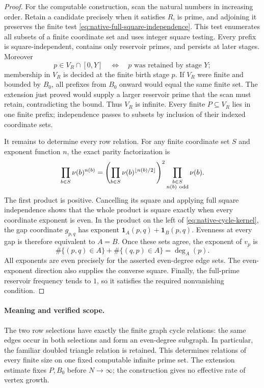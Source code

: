 \documentclass[11pt]{article}
\begin{document}
\begin{proof}
For the computable construction, scan the natural numbers in increasing
order. Retain a candidate precisely when it satisfies \(R\), is prime,
and adjoining it preserves the finite test
\eqref{eq:native-full-square-independence}.
This test enumerates all subsets of a finite coordinate set and uses
integer square testing. Every prefix is square-independent, contains only
reservoir primes, and persists at later stages. Moreover
\[
 p\in V_R\cap[0,Y]\quad\Longleftrightarrow\quad
 p\text{ was retained by stage }Y;
\]
membership in \(V_R\) is decided at the finite birth stage \(p\).
If \(V_R\) were finite and bounded by \(B_0\), all prefixes from \(B_0\)
onward would equal the same finite set. The extension just proved would
supply a larger reservoir prime that the scan must retain, contradicting
the bound. Thus \(V_R\) is infinite. Every finite \(P\subseteq V_R\)
lies in one finite prefix; independence passes to subsets by inclusion
of their indexed coordinate sets.

It remains to determine every row relation.
For any finite coordinate set \(S\) and exponent function \(n\),
the exact parity factorization is
\[
 \prod_{b\in S}\nu(b)^{n(b)}
 =
 \left(\prod_{b\in S}\nu(b)^{\lfloor n(b)/2\rfloor}\right)^2
 \prod_{\substack{b\in S\\n(b)\ {\rm odd}}}\nu(b).
\]
The first product is positive. Cancelling its square and applying full
square independence shows that the whole product is square exactly when
every coordinate exponent is even.
In the product on the left of \eqref{eq:native-cycle-kernel}, the gap
coordinate \(g_{p,q}\) has exponent
\(\mathbf1_A(p,q)+\mathbf1_B(p,q)\).
Evenness at every gap is therefore equivalent to \(A=B\).
Once these sets agree, the exponent of \(v_p\) is
\[
 \#\{(p,q)\in A\}+\#\{(q,p)\in A\}=\deg_A(p).
\]
All exponents are even precisely for the asserted even-degree edge sets.
The even-exponent direction also supplies the converse square.
Finally, the full-prime reservoir frequency tends to \(1\), so it
satisfies the required nonvanishing condition.
\end{proof}

\paragraph{Meaning and verified scope.}
The two row selections have exactly the finite graph cycle relations:
the same edges occur in both selections and form an even-degree subgraph.
In particular, the familiar doubled triangle relation is retained.
This determines relations of every finite size on one fixed computable
infinite prime set. The extension estimate fixes \(P,B_0\) before
\(N\to\infty\); the construction gives no effective rate of vertex growth.
\end{document}
